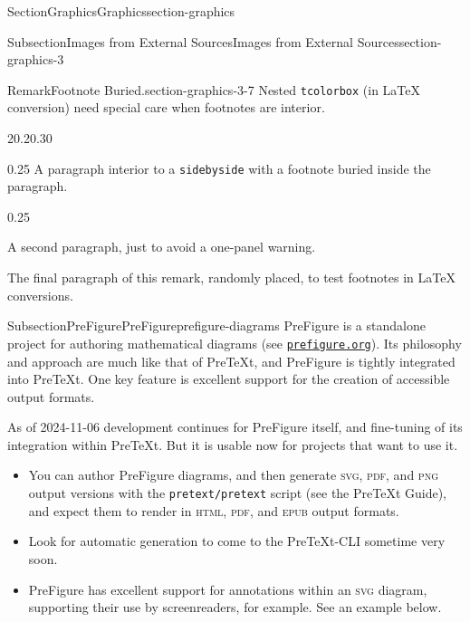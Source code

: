 \documentclass[twoside,10pt,]{article}
\newcommand{\mono}[1]{\texttt{#1}}
\newcommand{\initialism}[1]{\textsc{\MakeLowercase{#1}}}
\numberwithin{equation}{section}
\begin{document}
\begin{sectionptx}{Section}{Graphics}{}{Graphics}{}{}{section-graphics}
\begin{subsectionptx}{Subsection}{Images from External Sources}{}{Images from External Sources}{}{}{section-graphics-3}
\begin{remark}{Remark}{Footnote Buried.}{section-graphics-3-7}%
Nested \mono{tcolorbox} (in \LaTeX{} conversion) need special care when footnotes are interior.%
\begin{sidebyside}{2}{0.2}{0.3}{0}%
\begin{sbspanel}{0.25}%
A paragraph interior to a \mono{sidebyside} with a footnote\footnotemark{} buried inside the paragraph.%
\end{sbspanel}%
\begin{sbspanel}{0.25}%
\par
A second paragraph, just to avoid a one-panel warning.%
\end{sbspanel}%
\end{sidebyside}%
\par
The final paragraph of this remark, randomly placed, to test footnotes in \LaTeX{} conversions.%
\end{remark}
%
\end{subsectionptx}
%
%
\typeout{************************************************}
\typeout{************************************************}
%
\begin{subsectionptx}{Subsection}{PreFigure}{}{PreFigure}{}{}{prefigure-diagrams}
%
%
PreFigure is a standalone project for authoring mathematical diagrams (see \href{https://prefigure.org/}{\nolinkurl{prefigure.org}}).  Its philosophy and approach are much like that of PreTeXt, and PreFigure is tightly integrated into PreTeXt.  One key feature is excellent support for the creation of accessible output formats.%
\par
As of 2024-11-06 development continues for PreFigure itself, and fine-tuning of its integration within PreTeXt.  But it is usable now for projects that want to use it.%
\begin{itemize}[label=\textbullet]
\item{}You can author PreFigure diagrams, and then generate \initialism{SVG}, \initialism{PDF}, and \initialism{PNG} output versions with the \mono{pretext/pretext} script (see the PreTeXt Guide), and expect them to render in \initialism{HTML}, \initialism{PDF}, and \initialism{EPUB} output formats.%
\item{}Look for automatic generation to come to the PreTeXt-CLI sometime very soon.%
\item{}PreFigure has excellent support for annotations within an \initialism{SVG} diagram, supporting their use by screenreaders, for example.  See an example below.%

\end{itemize}
\end{subsectionptx}
\end{sectionptx}
\end{document}
